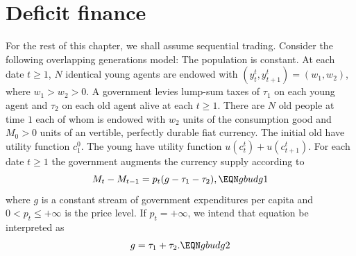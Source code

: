 





\section{Deficit finance}\label{sec:deffinance}%
For the rest of this chapter, we shall assume sequential trading.
Consider the following overlapping generations model:
The population is constant.
At each date $t \geq 1$, $N$ identical young agents are endowed
with $(y_t^t, y^t_{t+1}) = (w_1, w_2) $, where $w_1 > w_2 >0$.
A government   levies lump-sum taxes of
$\tau_1$ on each young agent and $\tau_2$ on each old agent
  alive at each $t \geq 1$.    There are $N$   old people at
time $1$ each of whom is endowed with $w_2$ units of the
consumption good and $M_0>0$ units of an vertible, perfectly durable
fiat currency. The initial old have utility function
$c^0_1$.   The young have utility function
$u(c^t_t) + u(c^t_{t+1})$.
 For each date $t \geq 1$ the government
augments the currency supply according to
$$ M_t - M_{t-1} = p_t ( g - \tau_1 -   \tau_2), \EQN gbudg1 $$
where $g$ is a constant stream of government expenditures per capita
and $0 < p_t \leq + \infty$ is the price level.
If $p_t = +\infty$, we intend  that    equation
 be interpreted as
$$ g = \tau_1 + \tau_2.  \EQN gbudg2 $$


